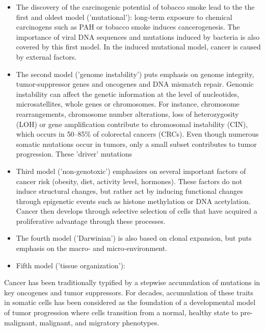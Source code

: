     \begin{itemize}
      \item The discovery of the carcinogenic potential of tobacco smoke lead to
        the the first and oldest model ('mutational'): long-term exposure to chemical
        carcinogens such as PAH or tobacco smoke induces cancerogenesis. The
        importance of viral DNA sequences and mutations induced by bacteria is also
        covered by this first model. In the induced mutational model, cancer is
        caused by external factors.

      \item The second model ('genome instability') puts emphasis on genome
        integrity, tumor-suppressor genes and oncogenes and DNA mismatch repair.
        Genomic instability can affect the genetic information at the level of
        nucleotides, microsatellites, whole genes or chromosomes. For instance,
        chromosome rearrangements, chromosome number alterations, loss of
        heterozygosity (LOH) or gene amplification contribute to chromosomal
        instability (CIN), which occurs in 50--85\% of colorectal cancers (CRCs).
        Even though numerous somatic mutations occur in tumors, only a small subset
        contributes to tumor progression. These 'driver' mutations

      \item Third model ('non-genotoxic') emphasizes on several important factors
        of cancer risk (obesity, diet, activity level, hormones). These factors do
        not induce structural changes, but rather act by inducing functional
        changes through epigenetic events such as histone methylation or DNA
        acetylation. Cancer then develops through selective selection of cells
        that have acquired a proliferative advantage through these processes.

      \item The fourth model ('Darwinian') is also based on clonal expansion, but
        puts emphasis on the macro- and micro-environment.

      \item Fifth model ('tissue organization'):

    \end{itemize}

    Cancer has been traditionally typified by a stepwise accumulation of
    mutations in key oncogenes and tumor suppressors. For decades, accumulation
    of these traits in somatic cells has been considered as the foundation of a
    developmental model of tumor progression where cells transition from a
    normal, healthy state to pre-malignant, malignant, and migratory phenotypes.

